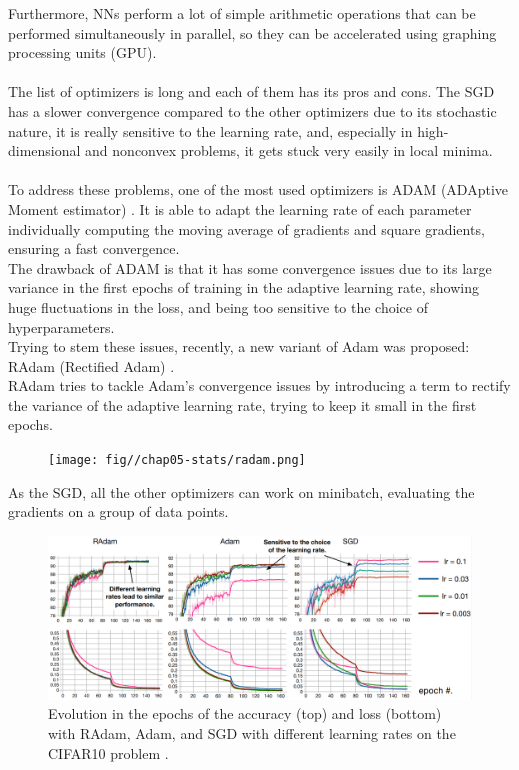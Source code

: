 Furthermore, NNs perform a lot of simple arithmetic operations that can be performed simultaneously in parallel, so they can be accelerated using graphing processing units (GPU).\\
\\
The list of optimizers is long and each of them has its pros and cons. The SGD has a slower convergence compared to the other optimizers due to its stochastic nature, it is really sensitive to the learning rate, and, especially in high-dimensional and nonconvex problems, it gets stuck very easily in local minima.\\
\\
To address these problems, one of the most used optimizers is ADAM (ADAptive Moment estimator) \cite{Kingma2014Adam:Optimization}. It is able to adapt the learning rate of each parameter individually computing the moving average of gradients and square gradients, ensuring a fast convergence.
\\
The drawback of ADAM is that it has some convergence issues due to its large variance in the first epochs of training in the adaptive learning rate, showing huge fluctuations in the loss, and being too sensitive to the choice of hyperparameters.\\
Trying to stem these issues, recently, a new variant of Adam was proposed: RAdam (Rectified Adam) \cite{Liu2019OnBeyond}.\\
RAdam tries to tackle Adam's convergence issues by introducing a term to rectify the variance of the adaptive learning rate, trying to keep it small in the first epochs.

\begin{figure}[H]
    \centering
    \texttt{[image: fig//chap05-stats/radam.png]}
    \label{fig:radam}
\end{figure}
As the SGD, all the other optimizers can work on minibatch, evaluating the gradients on a group of data points.
\begin{figure}[H]
    \centering
    \includegraphics[width=\linewidth]{fig//chap05-stats/radam_loss.png}
    \caption{Evolution in the epochs of the accuracy (top) and loss (bottom) with RAdam, Adam, and SGD with different learning rates on the CIFAR10 problem \cite{Ho-Phuoc2018CIFAR10Humans,Liu2019OnBeyond}.}
    \label{fig:radam_loss}
\end{figure}
\vspace{-1cm}

